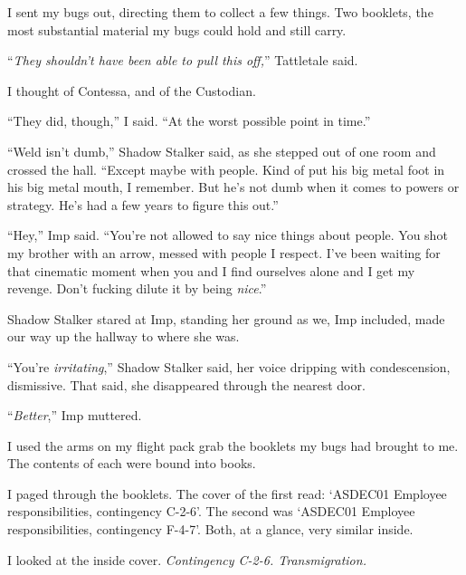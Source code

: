 I sent my bugs out, directing them to collect a few things.  Two booklets, the most substantial material my bugs could hold and still carry.



``\emph{They shouldn't have been able to pull this off,}'' Tattletale said.



I thought of Contessa, and of the Custodian.



``They did, though,'' I said.  ``At the worst possible point in time.''



``Weld isn't dumb,'' Shadow Stalker said, as she stepped out of one room and crossed the hall.  ``Except maybe with people.  Kind of put his big metal foot in his big metal mouth, I remember.  But he's not dumb when it comes to powers or strategy.  He's had a few years to figure this out.''



``Hey,'' Imp said.  ``You're not allowed to say nice things about people.  You shot my brother with an arrow, messed with people I respect.  I've been waiting for that cinematic moment when you and I find ourselves alone and I get my revenge.  Don't fucking dilute it by being \emph{nice}.''



Shadow Stalker stared at Imp, standing her ground as we, Imp included, made our way up the hallway to where she was.



``You're \emph{irritating},'' Shadow Stalker said, her voice dripping with condescension, dismissive.  That said, she disappeared through the nearest door.



``\emph{Better},'' Imp muttered.



I used the arms on my flight pack grab the booklets my bugs had brought to me.  The contents of each were bound into books.



I paged through the booklets.  The cover of the first read: `ASDEC01 Employee responsibilities, contingency C-2-6'.  The second was `ASDEC01 Employee responsibilities, contingency F-4-7'.  Both, at a glance, very similar inside.



I looked at the inside cover.  \emph{Contingency C-2-6.  Transmigration.}



